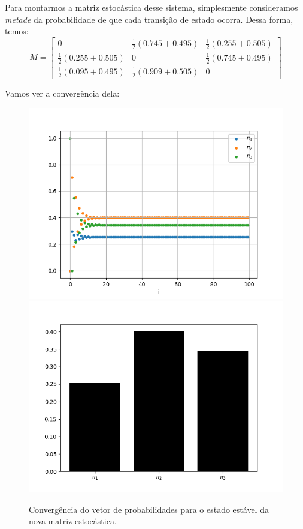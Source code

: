 \documentclass[12pt]{article}
\begin{document}
Para montarmos a matriz estocástica desse sistema, simplesmente consideramos \textit{metade} da probabilidade de que cada transição de estado ocorra. Dessa forma, temos:\\

$$
M = 
\begin{bmatrix}
0 & \frac{1}{2}(0.745 + 0.495)  & \frac{1}{2}(0.255 + 0.505)\\
\frac{1}{2}(0.255 + 0.505) & 0 & \frac{1}{2}(0.745 + 0.495)\\
\frac{1}{2}(0.095 + 0.495) & \frac{1}{2}(0.909 + 0.505) & 0
\end{bmatrix}
$$

Vamos ver a convergência dela:

\begin{figure}[H]
\centering
\includegraphics[scale=0.55]{graph9.png}
\includegraphics[scale=0.55]{graph10.png}
\caption{Convergência do vetor de probabilidades para o estado estável da nova matriz estocástica.}
\end{figure}
\end{document}

